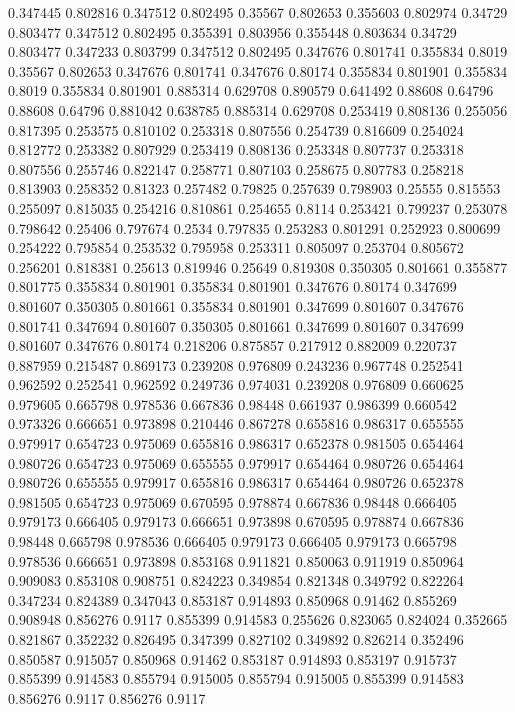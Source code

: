 0.347445 0.802816
0.347512 0.802495
0.35567 0.802653
0.355603 0.802974
0.34729 0.803477
0.347512 0.802495
0.355391 0.803956
0.355448 0.803634
0.34729 0.803477
0.347233 0.803799
0.347512 0.802495
0.347676 0.801741
0.355834 0.8019
0.35567 0.802653
0.347676 0.801741
0.347676 0.80174
0.355834 0.801901
0.355834 0.8019
0.355834 0.801901
0.885314 0.629708
0.890579 0.641492
0.88608 0.64796
0.88608 0.64796
0.881042 0.638785
0.885314 0.629708
0.253419 0.808136
0.255056 0.817395
0.253575 0.810102
0.253318 0.807556
0.254739 0.816609
0.254024 0.812772
0.253382 0.807929
0.253419 0.808136
0.253348 0.807737
0.253318 0.807556
0.255746 0.822147
0.258771 0.807103
0.258675 0.807783
0.258218 0.813903
0.258352 0.81323
0.257482 0.79825
0.257639 0.798903
0.25555 0.815553
0.255097 0.815035
0.254216 0.810861
0.254655 0.8114
0.253421 0.799237
0.253078 0.798642
0.25406 0.797674
0.2534 0.797835
0.253283 0.801291
0.252923 0.800699
0.254222 0.795854
0.253532 0.795958
0.253311 0.805097
0.253704 0.805672
0.256201 0.818381
0.25613 0.819946
0.25649 0.819308
0.350305 0.801661
0.355877 0.801775
0.355834 0.801901
0.355834 0.801901
0.347676 0.80174
0.347699 0.801607
0.350305 0.801661
0.355834 0.801901
0.347699 0.801607
0.347676 0.801741
0.347694 0.801607
0.350305 0.801661
0.347699 0.801607
0.347699 0.801607
0.347676 0.80174
0.218206 0.875857
0.217912 0.882009
0.220737 0.887959
0.215487 0.869173
0.239208 0.976809
0.243236 0.967748
0.252541 0.962592
0.252541 0.962592
0.249736 0.974031
0.239208 0.976809
0.660625 0.979605
0.665798 0.978536
0.667836 0.98448
0.661937 0.986399
0.660542 0.973326
0.666651 0.973898
0.210446 0.867278
0.655816 0.986317
0.655555 0.979917
0.654723 0.975069
0.655816 0.986317
0.652378 0.981505
0.654464 0.980726
0.654723 0.975069
0.655555 0.979917
0.654464 0.980726
0.654464 0.980726
0.655555 0.979917
0.655816 0.986317
0.654464 0.980726
0.652378 0.981505
0.654723 0.975069
0.670595 0.978874
0.667836 0.98448
0.666405 0.979173
0.666405 0.979173
0.666651 0.973898
0.670595 0.978874
0.667836 0.98448
0.665798 0.978536
0.666405 0.979173
0.666405 0.979173
0.665798 0.978536
0.666651 0.973898
0.853168 0.911821
0.850063 0.911919
0.850964 0.909083
0.853108 0.908751
0.824223 0.349854
0.821348 0.349792
0.822264 0.347234
0.824389 0.347043
0.853187 0.914893
0.850968 0.91462
0.855269 0.908948
0.856276 0.9117
0.855399 0.914583
0.255626 0.823065
0.824024 0.352665
0.821867 0.352232
0.826495 0.347399
0.827102 0.349892
0.826214 0.352496
0.850587 0.915057
0.850968 0.91462
0.853187 0.914893
0.853197 0.915737
0.855399 0.914583
0.855794 0.915005
0.855794 0.915005
0.855399 0.914583
0.856276 0.9117
0.856276 0.9117
